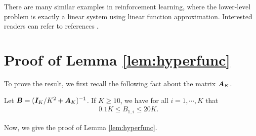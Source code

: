 There are many similar examples in reinforcement learning, 
where the lower-level problem is exactly a linear system using linear function approximation.
Interested readers can refer to references \citep{hong2023two,zeng2024two,zeng2024fast}.

\section{Proof of Lemma \ref{lem:hyperfunc}} \label{apx:proof-lem-hyperfunc}

To prove the result, we first recall the following fact about the matrix ${\bm{A}}_K$.
\begin{lem} \label{lem:li}
Let ${\bm{B}} = ( {\bm{I}}_K / K^2 + {\bm{A}}_K )^{-1}$. If $K \ge 10$, we have for all $i = 1,\cdots,K$ that
\begin{align*}
     0.1K \le B_{1,i} \le 20K.
\end{align*}
\end{lem}

Now, we give the proof of Lemma \ref{lem:hyperfunc}.

